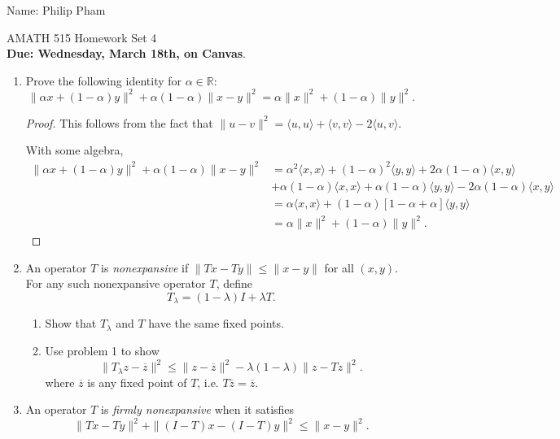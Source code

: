 \documentclass[11pt]{amsart}
\begin{document}
{\Large Name: Philip Pham}  \\
\begin{center}
\Large AMATH 515 \hskip 2in Homework Set 4\\
{\bf Due: Wednesday, March 18th, on Canvas}. 
\end{center}
\bigskip
\begin{enumerate}

\item  Prove the following identity for $\alpha \in \mathbb{R}$:
\[
\|\alpha x + (1-\alpha) y\|^2 + \alpha(1-\alpha) \|x-y\|^2 = \alpha \|x\|^2 + (1-\alpha) \|y\|^2.
\]

\begin{proof}
  This follows from the fact that
  $\| u - v \|^2 = \langle u, u \rangle + \langle v, v \rangle -
  2\langle u, v \rangle$.

  With some algebra,
  \begin{align*}
    \|\alpha x + (1-\alpha) y\|^2 + \alpha(1-\alpha) \|x-y\|^2
    &= \alpha^2 \langle x, x \rangle + (1-\alpha)^2 \langle y, y \rangle
      + 2\alpha(1-\alpha)\langle x, y \rangle \\
    & + \alpha(1-\alpha)\langle x, x \rangle + \alpha(1-\alpha)\langle y, y \rangle
      -2\alpha(1-\alpha)\langle x, y \rangle\\
    &= \alpha \langle x, x \rangle + (1-\alpha)\left[1 - \alpha + \alpha\right]\langle y, y \rangle \\
    &=\alpha \|x\|^2 + (1-\alpha) \|y\|^2.
  \end{align*}
\end{proof}


\item An operator $T$ is {\it nonexpansive} if  $\|Tx - Ty\| \leq \|x - y\|$ for all $(x,y)$. 
For any such nonexpansive operator $T$, define 
\[
T_\lambda = (1-\lambda)I + \lambda T. 
\]
\begin{enumerate}
\item Show that $T_\lambda$ and $T$ have the same fixed points. 
\item Use problem 1 to show 
\[
\|T_\lambda z - \overline z\|^2 \leq \|z-\overline z\|^2 - \lambda(1-\lambda) \|z - Tz\|^2.
\]
where $\overline z$ is any fixed point of $T$, i.e. $T\overline z = \overline z$.

\end{enumerate}

\bigskip\bigskip\bigskip

\item An operator $T$ is {\it firmly nonexpansive} when it satisfies 
\[
\|Tx - Ty\|^2 + \|(I-T) x - (I-T)y\|^2 \leq \|x-y\|^2. 
\]



\end{enumerate}
\end{document}
